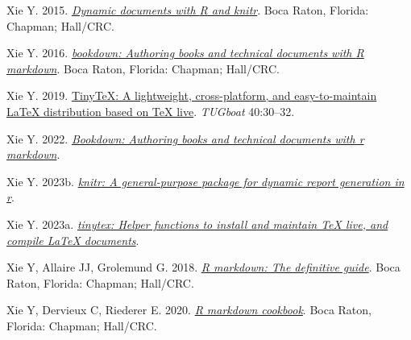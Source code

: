 \documentclass[10pt,a4paper]{article}
\newlength{\cslhangindent}
\newenvironment{CSLReferences}[2] %
 {\begin{list}{}{%
  \setlength{\itemindent}{0pt}
  \setlength{\leftmargin}{0pt}
  \setlength{\parsep}{0pt}
  \ifodd #1
   \setlength{\leftmargin}{\cslhangindent}
   \setlength{\itemindent}{-1\cslhangindent}
  \fi
  \setlength{\itemsep}{#2\baselineskip}}}
 {\end{list}}
\begin{document}
\begin{CSLReferences}{1}{0}
Xie Y. 2015. \emph{\href{https://yihui.org/knitr/}{Dynamic documents with {R} and knitr}}. Boca Raton, Florida: Chapman; Hall/CRC.

Xie Y. 2016. \emph{\href{https://bookdown.org/yihui/bookdown}{{bookdown}: Authoring books and technical documents with {R} markdown}}. Boca Raton, Florida: Chapman; Hall/CRC.

Xie Y. 2019. \href{https://tug.org/TUGboat/Contents/contents40-1.html}{{TinyTeX}: A lightweight, cross-platform, and easy-to-maintain LaTeX distribution based on TeX live}. \emph{TUGboat} 40:30--32.

Xie Y. 2022. \emph{\href{https://CRAN.R-project.org/package=bookdown}{Bookdown: Authoring books and technical documents with r markdown}}.

Xie Y. 2023b. \emph{\href{https://yihui.org/knitr/}{{knitr}: A general-purpose package for dynamic report generation in r}}.

Xie Y. 2023a. \emph{\href{https://github.com/rstudio/tinytex}{{tinytex}: Helper functions to install and maintain TeX live, and compile LaTeX documents}}.

Xie Y, Allaire JJ, Grolemund G. 2018. \emph{\href{https://bookdown.org/yihui/rmarkdown}{R markdown: The definitive guide}}. Boca Raton, Florida: Chapman; Hall/CRC.

Xie Y, Dervieux C, Riederer E. 2020. \emph{\href{https://bookdown.org/yihui/rmarkdown-cookbook}{R markdown cookbook}}. Boca Raton, Florida: Chapman; Hall/CRC.

\end{CSLReferences}
\end{document}
